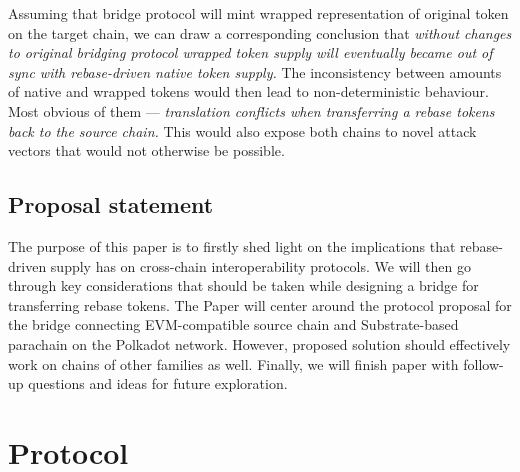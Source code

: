 \documentclass{article}
\begin{document}
Assuming that bridge protocol will mint wrapped representation of original token on the target chain, we can draw a corresponding conclusion that \textit{without changes to original bridging protocol wrapped token supply will eventually became out of sync with rebase-driven native token supply.} The inconsistency between amounts of native and wrapped tokens would then lead to non-deterministic behaviour. Most obvious of them --- \textit{translation conflicts when transferring a rebase tokens back to the source chain.} This would also expose both chains to novel attack vectors that would not otherwise be possible.

\subsection{Proposal statement}

The purpose of this paper is to firstly shed light on the implications that rebase-driven supply has on cross-chain interoperability protocols. We will then go through key considerations that should be taken while designing a bridge for transferring rebase tokens. The Paper will center around the protocol proposal for the bridge connecting EVM-compatible source chain and Substrate-based parachain on the Polkadot network. However, proposed solution should effectively work on chains of other families as well. Finally, we will finish paper with follow-up questions and ideas for future exploration.

\section{Protocol}



\end{document}
